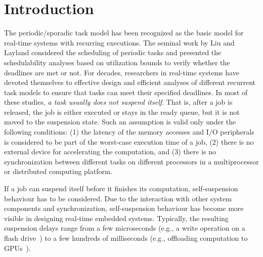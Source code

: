 \section{Introduction}

The periodic/sporadic task model has been recognized as the basic
model for real-time systems with recurring executions.  
The seminal work by Liu and Layland \cite{Liu_1973} considered the
scheduling of periodic tasks and presented the schedulability analyses
based on utilization bounds to verify whether the deadlines are met or
not.  For decades, researchers in real-time systems have
devoted themselves to effective design and efficient analyses of
different recurrent task models to ensure that tasks can meet their
specified deadlines. In most of these studies, \emph{a task usually does not
 suspend itself}. That is, after a job is released, the job
is either executed or stays in the ready queue, but it is not moved to
the suspension state.  Such an assumption is valid only under the
following conditions: (1) the latency of the memory accesses and I/O
peripherals is considered to be part of the worst-case execution time
of a job, (2) there is no external device for accelerating the
computation, and (3) there is no synchronization between different
tasks on different processors in a multiprocessor or distributed
computing platform.


If a job can suspend itself before it finishes its computation,
self-suspension behaviour has to be considered. Due to the interaction
with other system components and synchronization, self-suspension
behaviour has become more visible in designing real-time embedded
systems.  Typically, the resulting suspension delays range from a few
microseconds (e.g., a write operation on a flash
drive~\cite{Kang:rtss07}) to a few hundreds of milliseconds (e.g.,
offloading computation to GPUs~\cite{Kato_2011,Liu_2014}).

